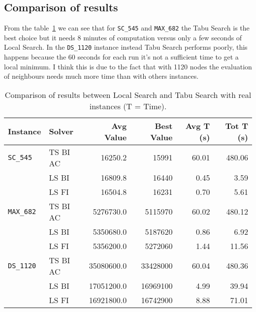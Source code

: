 
\subsection{Comparison of results}
	
	From the table~\ref{tab:ri-comparison-results} we can see that for \verb|SC_545| and \verb|MAX_682| the Tabu Search is the best choice but it needs 8 minutes of computation versus only a few seconds of Local Search. In the \verb|DS_1120| instance instead Tabu Search performs poorly, this happens because the 60 seconds for each run it's not a sufficient time to get a local minimum. I think this is due to the fact that with 1120 nodes the evaluation of neighbours needs much more time than with others instances.

	\begin{table}[hb]
		\centering
		\begin{tabular}{llrrrr}
			\toprule
			\textbf{Instance} & \textbf{Solver} & \textbf{Avg Value} & \textbf{Best Value} & \textbf{Avg T (s)} & \textbf{Tot T (s)} \\
			\toprule
			\verb|SC_545|           & TS BI AC        & 16250.2            & 15991               & 60.01                 & 480.06                \\
			& LS BI           & 16809.8            & 16440               & 0.45                  & 3.59                  \\
			& LS FI           & 16504.8            & 16231               & 0.70                  & 5.61                  \\
			\midrule
			\verb|MAX_682|          & TS BI AC        & 5276730.0          & 5115970             & 60.02                 & 480.12                \\
			& LS BI           & 5350680.0          & 5187620             & 0.86       &  6.92           \\
			& LS FI           & 5356200.0          & 5272060             & 1.44                 &   11.56                \\
			\midrule
			\verb|DS_1120|          & TS BI AC        & 35080600.0         & 33428000            & 60.04                 & 480.36                \\
			& LS BI           & 17051200.0         & 16969100            & 4.99                & 39.94                \\
			& LS FI           & 16921800.0         & 16742900            & 8.88                & 71.01    \\
			\bottomrule             
		\end{tabular}
		\caption{Comparison of results between Local Search and Tabu Search with real instances (T = Time).}
		\label{tab:ri-comparison-results}
	\end{table}